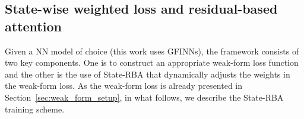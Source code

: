 \documentclass[final]{siamltex}
\newcommand{\bfa}[1]{\boldsymbol{#1}}
\begin{document}


\subsection{State-wise weighted loss and residual-based attention}
\label{sec:sw_rba}
Given a NN model of choice (this work uses GFINNs), the framework consists of two key components. One is to construct an appropriate weak-form loss function and the other is the use of State-RBA that dynamically adjusts the weights in the weak-form loss.
As the weak-form loss is already presented in Section~\ref{sec:weak_form_setup}, in what follows, we describe the State-RBA training scheme.




\end{document}
